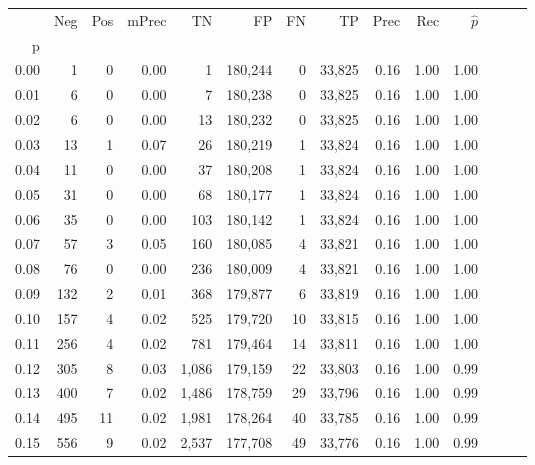 \begin{tabular}{rrrrrrrrrrrrrr}
\toprule
{} &    Neg &  Pos & mPrec &       TN &       FP &      FN &      TP &  Prec &   Rec & $\hat{p}$ \\
p    &        &      &       &          &          &         &         &       &       &           \\
\midrule
0.00 &      1 &    0 &  0.00 &        1 &  180,244 &       0 &  33,825 &  0.16 &  1.00 &      1.00 \\
0.01 &      6 &    0 &  0.00 &        7 &  180,238 &       0 &  33,825 &  0.16 &  1.00 &      1.00 \\
0.02 &      6 &    0 &  0.00 &       13 &  180,232 &       0 &  33,825 &  0.16 &  1.00 &      1.00 \\
0.03 &     13 &    1 &  0.07 &       26 &  180,219 &       1 &  33,824 &  0.16 &  1.00 &      1.00 \\
0.04 &     11 &    0 &  0.00 &       37 &  180,208 &       1 &  33,824 &  0.16 &  1.00 &      1.00 \\
0.05 &     31 &    0 &  0.00 &       68 &  180,177 &       1 &  33,824 &  0.16 &  1.00 &      1.00 \\
0.06 &     35 &    0 &  0.00 &      103 &  180,142 &       1 &  33,824 &  0.16 &  1.00 &      1.00 \\
0.07 &     57 &    3 &  0.05 &      160 &  180,085 &       4 &  33,821 &  0.16 &  1.00 &      1.00 \\
0.08 &     76 &    0 &  0.00 &      236 &  180,009 &       4 &  33,821 &  0.16 &  1.00 &      1.00 \\
0.09 &    132 &    2 &  0.01 &      368 &  179,877 &       6 &  33,819 &  0.16 &  1.00 &      1.00 \\
0.10 &    157 &    4 &  0.02 &      525 &  179,720 &      10 &  33,815 &  0.16 &  1.00 &      1.00 \\
0.11 &    256 &    4 &  0.02 &      781 &  179,464 &      14 &  33,811 &  0.16 &  1.00 &      1.00 \\
0.12 &    305 &    8 &  0.03 &    1,086 &  179,159 &      22 &  33,803 &  0.16 &  1.00 &      0.99 \\
0.13 &    400 &    7 &  0.02 &    1,486 &  178,759 &      29 &  33,796 &  0.16 &  1.00 &      0.99 \\
0.14 &    495 &   11 &  0.02 &    1,981 &  178,264 &      40 &  33,785 &  0.16 &  1.00 &      0.99 \\
0.15 &    556 &    9 &  0.02 &    2,537 &  177,708 &      49 &  33,776 &  0.16 &  1.00 &      0.99 \\

\end{tabular}
